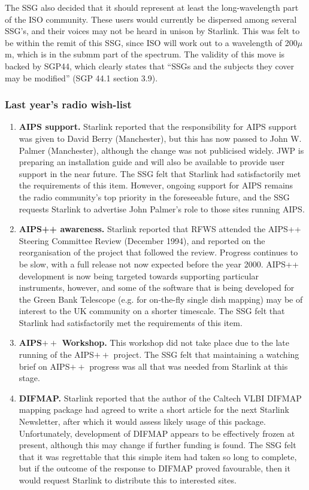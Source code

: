 The SSG also decided that it should represent at least the
long-wavelength part of the ISO community. These users would currently
be dispersed among several SSG's, and their voices may not be heard in
unison by Starlink. This was felt to be within the remit of this SSG,
since ISO will work out to a wavelength of 200$\mu$m, which is in the
submm part of the spectrum. The validity of this move is backed by
SGP44, which clearly states that ``SSGs and the subjects they cover
may be modified'' (SGP 44.1 section 3.9).

\subsubsection{Last year's radio wish-list}

\begin{enumerate}
\item {\bf AIPS support.} Starlink reported that the responsibility for AIPS 
support was given to David Berry (Manchester), but this has now passed
to John W. Palmer (Manchester), although the change was not publicised
widely. JWP is preparing an installation guide and will also be
available to provide user support in the near future. The SSG felt
that Starlink had satisfactorily met the requirements of this
item. However, ongoing support for AIPS remains the radio community's
top priority in the foreseeable future, and the SSG requests Starlink
to advertise John Palmer's role to those sites running AIPS.

\item {\bf AIPS++ awareness.} Starlink reported that RFWS attended the AIPS++ 
Steering Committee Review (December 1994), and reported on the
reorganisation of the project that followed the review. Progress
continues to be slow, with a full release not now expected before the
year 2000. AIPS++ development is now being targeted towards supporting
particular instruments, however, and some of the software that is
being developed for the Green Bank Telescope (e.g. for on-the-fly
single dish mapping) may be of interest to the UK community on a
shorter timescale. The SSG felt that Starlink had satisfactorily met
the requirements of this item.

\item {\bf AIPS$++$ Workshop.} This workshop did not take place due to the late
running of the AIPS$++$ project. The SSG felt that maintaining a
watching brief on AIPS$++$ progress was all that was needed from
Starlink at this stage.

\item {\bf DIFMAP.} Starlink reported that the author of the Caltech
VLBI DIFMAP mapping package had agreed to write a short article for
the next Starlink Newsletter, after which it would assess likely usage
of this package.  Unfortunately, development of DIFMAP appears to be
effectively frozen at present, although this may change if further
funding is found. The SSG felt that it was regrettable that this
simple item had taken so long to complete, but if the outcome of the
response to DIFMAP proved favourable, then it would request Starlink
to distribute this to interested sites.


\end{enumerate}
